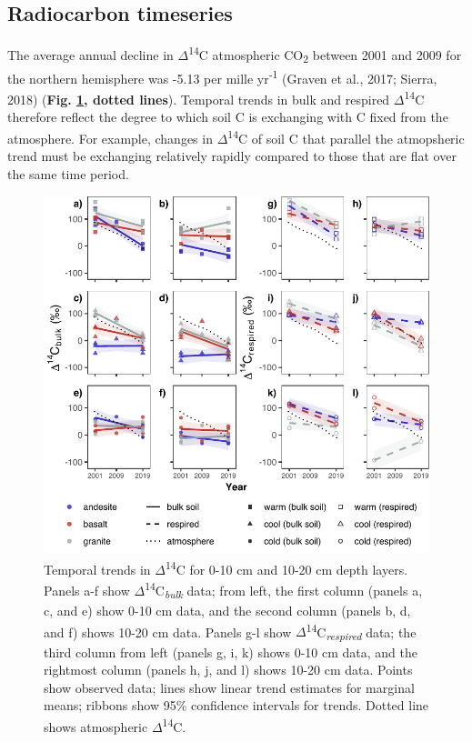 \documentclass[english,man,floatsintext]{apa6}
\begin{document}
\hypertarget{radiocarbon-timeseries}{%
\subsection{Radiocarbon timeseries}\label{radiocarbon-timeseries}}

The average annual decline in \(\Delta\)\textsuperscript{14}C atmospheric CO\textsubscript{2} between 2001 and 2009 for the northern hemisphere was -5.13 per mille yr\textsuperscript{-1} (Graven et al., 2017; Sierra, 2018) (\textbf{Fig. \ref{fig:plot-ts-14c}, dotted lines}). Temporal trends in bulk and respired \(\Delta\)\textsuperscript{14}C therefore reflect the degree to which soil C is exchanging with C fixed from the atmosphere. For example, changes in \(\Delta\)\textsuperscript{14}C of soil C that parallel the atmopsheric trend must be exchanging relatively rapidly compared to those that are flat over the same time period.



\begin{figure}

{\centering \includegraphics{sra-blk-inc-19_files/figure-latex/plot-ts-14c-1} 

}

\caption{Temporal trends in \(\Delta\)\textsuperscript{14}C for 0-10 cm and 10-20 cm depth layers. Panels a-f show \(\Delta\)\textsuperscript{14}C\textsubscript{\emph{bulk}} data; from left, the first column (panels a, c, and e) show 0-10 cm data, and the second column (panels b, d, and f) shows 10-20 cm data. Panels g-l show \(\Delta\)\textsuperscript{14}C\textsubscript{\emph{respired}} data; the third column from left (panels g, i, k) shows 0-10 cm data, and the rightmost column (panels h, j, and l) shows 10-20 cm data. Points show observed data; lines show linear trend estimates for marginal means; ribbons show 95\% confidence intervals for trends. Dotted line shows atmospheric \(\Delta\)\textsuperscript{14}C.}\label{fig:plot-ts-14c}
\end{figure}
\end{document}
